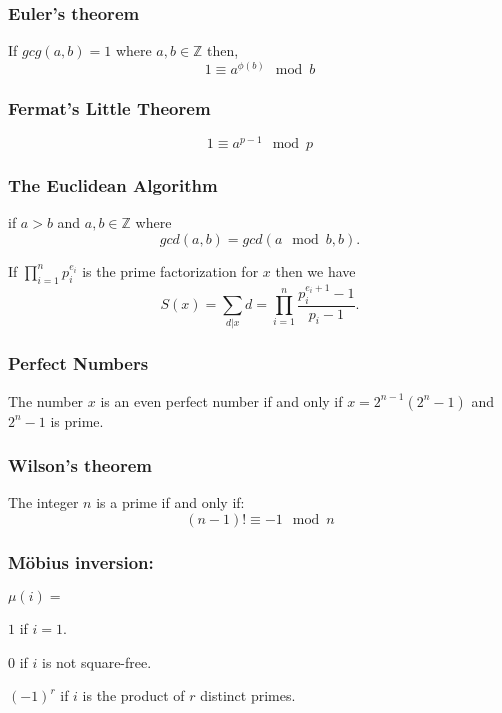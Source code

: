\smallskip

\subsubsection{Euler's theorem}

If $gcg(a,b)=1$ where $a,b \in \mathbb{Z}$ then,
\[ 1 \equiv a^{\phi(b)} \mod{b} \]

\medskip

\subsubsection{Fermat's Little Theorem}
\[1 \equiv a^{p-1} \mod{p} \]

\medskip

\subsubsection{The Euclidean Algorithm}
if $a > b$ and $a,b \in \mathbb{Z}$ where 
\[gcd(a, b) = gcd(a \mod{b}, b).\]


If $\prod_{i=1}^n p^{e_{i}}_i$ is the prime factorization for $x$ then we have
\[S(x) = \sum_{d\vert x} d = \prod_{i=1}^{n} \frac{p^{e_{i}+1}_{i} - 1}{p_{i} - 1}.\]

\subsubsection{Perfect Numbers}
The number $x$ is an even perfect number if and only if $x = 2^{n-1}(2^{n} - 1)$ and $2^{n} - 1$ is prime.


\subsubsection{Wilson's theorem}
The integer $n$ is a prime if and only if:
\[(n-1)! \equiv -1 \mod{n}\]

\pagebreak

\subsubsection{M\"obius inversion:}

$\mu(i) = $
\begin{case}
$1$ if $i = 1$.
\end{case}
\smallskip
\begin{case}
$0$ if $i$ is not square-free.
\end{case}
\smallskip
\begin{case}
$(-1)^{r}$ if $i$ is the product of $r$ distinct primes.
\end{case}


